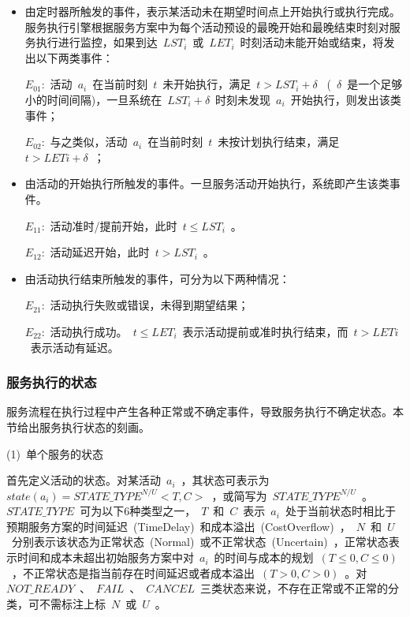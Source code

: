 \begin{itemize}
\item 由定时器所触发的事件，表示某活动未在期望时间点上开始执行或执行完成。服务执行引擎根据服务方案中为每个活动预设的最晚开始和最晚结束时刻对服务执行进行监控，如果到达~$LST_i$~或~$LET_i$~时刻活动未能开始或结束，将发出以下两类事件：

$E_{01}$:~活动~$a_i$~在当前时刻~$t$~未开始执行，满足~$t>LST_i+\delta$~ (~$\delta$~是一个足够小的时间间隔)，一旦系统在~$LST_i+\delta$~时刻未发现~$a_i$~开始执行，则发出该类事件；

$E_{02}$:~与之类似，活动~$a_i$~在当前时刻~$t$~未按计划执行结束，满足~$t>LETi+\delta$~；

\item 由活动的开始执行所触发的事件。一旦服务活动开始执行，系统即产生该类事件。

$E_{11}$:~活动准时/提前开始，此时~$t\le LST_i$~。

$E_{12}$:~活动延迟开始，此时~$t>LST_i$~。

\item 由活动执行结束所触发的事件，可分为以下两种情况：

$E_{21}$:~活动执行失败或错误，未得到期望结果；

$E_{22}$:~活动执行成功。~$t\le LET_i$~表示活动提前或准时执行结束，而~$t>LETi$~表示活动有延迟。

\end{itemize}


\subsubsection{服务执行的状态} \label{sec:service_state}

服务流程在执行过程中产生各种正常或不确定事件，导致服务执行不确定状态。本节给出服务执行状态的刻画。

(1)~单个服务的状态

首先定义活动的状态。对某活动~$a_i$~，其状态可表示为~$state(a_i)=STATE\_TYPE^{N/U}<T, C>$~，或简写为~$STATE\_TYPE^{N/U}$~。~$STATE\_TYPE$~可为以下6种类型之一，~$T$~和~$C$~表示~$a_i$~处于当前状态时相比于预期服务方案的时间延迟~(TimeDelay)~和成本溢出~(CostOverflow)~，~$N$~和~$U$~分别表示该状态为正常状态~(Normal)~或不正常状态~(Uncertain)~，正常状态表示时间和成本未超出初始服务方案中对~$a_i$~的时间与成本的规划~$(T\le 0, C\le 0)$~，不正常状态是指当前存在时间延迟或者成本溢出~$(T>0, C>0)$~。对~$NOT\_READY$~、~$FAIL$~、~$CANCEL$~三类状态来说，不存在正常或不正常的分类，可不需标注上标~$N$~或~$U$~。

